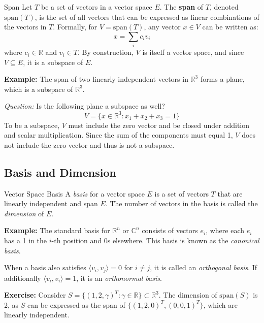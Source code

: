 \begin{definitionbox}{Span}
Let \( T \) be a set of vectors in a vector space \( E \). The \textbf{span} of \( T \), denoted \( \text{span}(T) \), is the set of all vectors that can be expressed as linear combinations of the vectors in \( T \). Formally, for \( V = \text{span}(T) \), any vector \( x \in V \) can be written as:
\[ x = \sum_{i} c_i v_i \]
where \( c_i \in \mathbb{R} \) and \( v_i \in T \). By construction, \( V \) is itself a vector space, and since \( V \subseteq E \), it is a subspace of \( E \).
\end{definitionbox}

\textbf{Example:} The span of two linearly independent vectors in \( \mathbb{R}^3 \) forms a plane, which is a subspace of \( \mathbb{R}^3 \).

\textit{Question:} Is the following plane a subspace as well?
\[ V = \{ x \in \mathbb{R}^3 : x_1 + x_2 + x_3 = 1 \} \]
To be a subspace, \( V \) must include the zero vector and be closed under addition and scalar multiplication. Since the sum of the components must equal 1, \( V \) does not include the zero vector and thus is not a subspace.

\subsection{Basis and Dimension}

\begin{definitionbox}{Vector Space Basis} A \textit{basis} for a vector space \( E \) is a set of vectors \( T \) that are linearly independent and span \( E \). The number of vectors in the basis is called the \textit{dimension} of \( E \).
\end{definitionbox}

\textbf{Example:} The standard basis for \( \mathbb{R}^n \) or \( \mathbb{C}^n \) consists of vectors \( e_i \), where each \( e_i \) has a 1 in the \( i \)-th position and 0s elsewhere. This basis is known as the \textit{canonical basis}.

When a basis also satisfies \( \langle v_i, v_j \rangle = 0 \) for \( i \neq j \), it is called an \textit{orthogonal basis}. If additionally \( \langle v_i, v_i \rangle = 1 \), it is an \textit{orthonormal basis}.

\textbf{Exercise:} Consider \( S = \{(1,2,\gamma)^T : \gamma \in \mathbb{R}\} \subset \mathbb{R}^3 \). The dimension of \( \text{span}(S) \) is 2, as \( S \) can be expressed as the span of \( \{(1,2,0)^T, (0,0,1)^T\} \), which are linearly independent.

